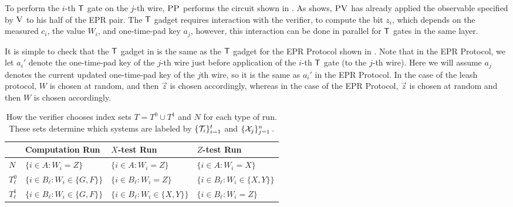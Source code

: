 \documentclass{toc}
\newcommand{\ver}{\textsc{V}}
\newcommand{\pv}{\textsc{PV}}
\newcommand{\pp}{\textsc{PP}}
\begin{document}
To perform the $i$-th $\sf T$ gate on the $j$-th wire, $\pp$ performs the circuit shown in . As  shows, $\pv$ has already applied the observable specified by $\ver$ to his half of the EPR pair. The $\sf T$ gadget requires interaction with the verifier, to compute the bit $z_i$, which depends on the measured $c_i$, the value $W_i$, and one-time-pad key $a_j$, however, this interaction can be done in parallel for $\sf T$ gates in the same layer. 


It is simple to check that the $\sf T$ gadget in  is the same as the $\sf T$ gadget for the EPR Protocol shown in . Note that in the EPR Protocol, we let $a_i'$ denote the one-time-pad key of the $j$-th wire just before application of the $i$-th $\sf T$ gate (to the $j$-th wire). Here we will assume $a_j$ denotes the current updated one-time-pad key of the $j$th wire, so it is the same as $a_i'$ in the EPR Protocol. In the case of the leash protocol, $W$ is chosen at random, and then $\vec{z}$ is chosen accordingly, whereas in the case of the EPR Protocol, $\vec{z}$ is chosen at random and then $W$ is chosen accordingly. 




\begin{table}[H]
\centering
\setlength\tabcolsep{1.5pt}
\begin{tabular}{|l|lll|}
\hline
& Computation Run & $X$-test Run & $Z$-test Run\\
\hline
$N$ & $\{i\in A:W_i=Z\}$ & $\{i\in A:W_i=Z\}$ & $\{i\in A:W_i=X\}$\\
$T^0_{\ell}$ & $\{i\in B_{\ell}:W_i\in \{G,F\}\}$ & $\{i\in B_{\ell}:W_i=Z\}$ & $\{i\in B_{\ell}:W_i\in \{X,Y\}\}$ \\
$T^1_{\ell}$ & $\{i\in B_{\ell}:W_i\in \{G,F\}\}$ & $\{i\in B_{\ell}:W_i\in \{X,Y\}\}$ & $\{i\in B_{\ell}:W_i=Z\}$ \\
\hline
\end{tabular}
\caption{How the verifier chooses index sets $T=T^0\cup T^1$ and $N$ for each type of run. These sets determine which systems are labeled by $\{{\cal T}_{i}\}_{i=1}^t$ and $\{{\cal X}_{j}\}_{j=1}^n$\,.
}   %
\label{tab:index-choices}
\end{table}
\end{document}
